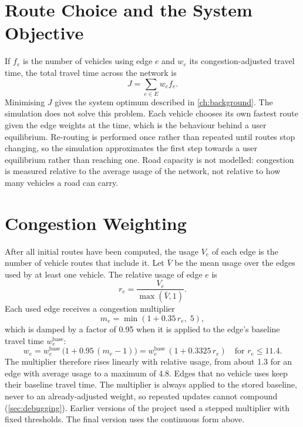 \documentclass[12pt]{report}
\begin{document}
\section{Route Choice and the System Objective}

If $f_e$ is the number of vehicles using edge $e$ and $w_e$ its congestion-adjusted travel time, the total travel time across the network is
\begin{equation}
J = \sum_{e \in E} w_e f_e .
\label{eq:J}
\end{equation}
Minimising $J$ gives the system optimum described in \cref{ch:background}. The simulation does not solve this problem. Each vehicle chooses its own fastest route given the edge weights at the time, which is the behaviour behind a user equilibrium. Re-routing is performed once rather than repeated until routes stop changing, so the simulation approximates the first step towards a user equilibrium rather than reaching one. Road capacity is not modelled: congestion is measured relative to the average usage of the network, not relative to how many vehicles a road can carry.

\section{Congestion Weighting}
\label{sec:weighting}

After all initial routes have been computed, the usage $V_e$ of each edge is the number of vehicle routes that include it. Let $\bar{V}$ be the mean usage over the edges used by at least one vehicle. The relative usage of edge $e$ is
\begin{equation}
r_e = \frac{V_e}{\max(\bar{V}, 1)} .
\label{eq:ratio}
\end{equation}
Each used edge receives a congestion multiplier
\begin{equation}
m_e = \min(1 + 0.35\, r_e,\; 5),
\label{eq:multiplier}
\end{equation}
which is damped by a factor of 0.95 when it is applied to the edge's baseline travel time $w_e^{\text{base}}$:
\begin{equation}
w_e = w_e^{\text{base}}\,\big(1 + 0.95\,(m_e - 1)\big) = w_e^{\text{base}}\,(1 + 0.3325\, r_e) \quad \text{for } r_e \le 11.4 .
\label{eq:effective}
\end{equation}
The multiplier therefore rises linearly with relative usage, from about 1.3 for an edge with average usage to a maximum of 4.8. Edges that no vehicle uses keep their baseline travel time. The multiplier is always applied to the stored baseline, never to an already-adjusted weight, so repeated updates cannot compound (\cref{sec:debugging}). Earlier versions of the project used a stepped multiplier with fixed thresholds. The final version uses the continuous form above.
\end{document}
